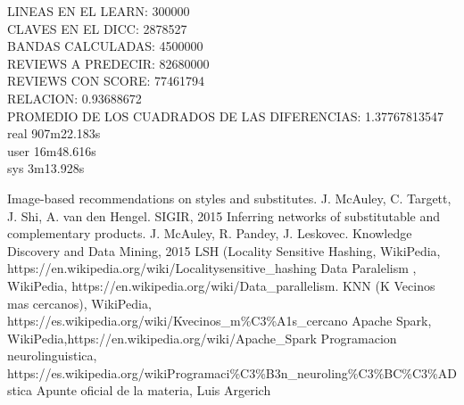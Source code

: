 \documentclass[a4paper,10pt]{article}
\begin{document}
	
	LINEAS EN EL LEARN: 300000\\
	CLAVES EN EL DICC: 2878527\\
	BANDAS CALCULADAS: 4500000\\
	REVIEWS A PREDECIR: 82680000\\
	REVIEWS CON SCORE: 77461794\\
	RELACION: 0.93688672\\
	PROMEDIO DE LOS CUADRADOS DE LAS DIFERENCIAS: 1.37767813547\\
	real	907m22.183s\\
	user	16m48.616s\\
	sys	3m13.928s\\
	
	
	\begin{thebibliography}{99}
		 Image-based recommendations on styles and substitutes. J. McAuley, C. Targett, J. Shi, A. van den Hengel. SIGIR, 2015
		 Inferring networks of substitutable and complementary products. J. McAuley, R. Pandey, J. Leskovec. Knowledge Discovery and Data Mining, 2015
		 LSH (Locality Sensitive Hashing, WikiPedia, https://en.wikipedia.org/wiki/Locality\-sensitive\_hashing
		 Data Paralelism , WikiPedia, https://en.wikipedia.org/wiki/Data\_parallelism.
		 KNN (K Vecinos mas cercanos), WikiPedia, https://es.wikipedia.org/wiki/K\-vecinos\_m\%C3\%A1s\_cercano
		 Apache Spark, WikiPedia,https://en.wikipedia.org/wiki/Apache\_Spark
		 Programacion neurolinguistica, https://es.wikipedia.org/wikiProgramaci\%C3\%B3n\_neuroling\%C3\%BC\%C3\%ADstica
		 Apunte oficial de la materia, Luis Argerich

	\end{thebibliography}
	
\end{document}
